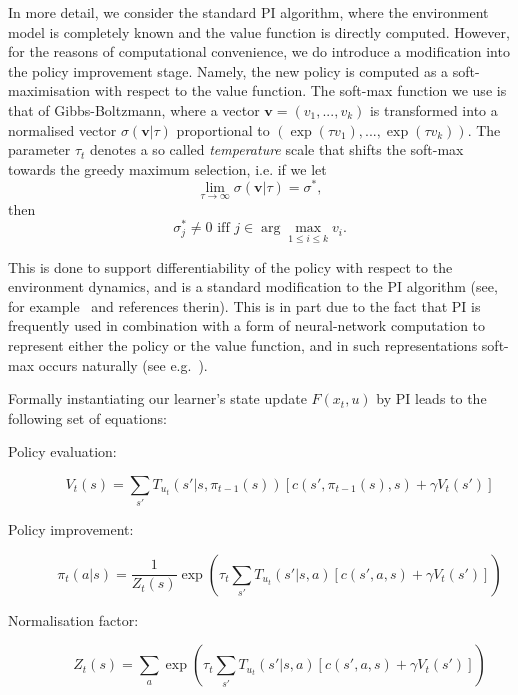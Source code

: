 In more detail, we consider the standard PI algorithm, where the
environment model is completely known and the value function is
directly computed. However, for the reasons of computational
convenience, we do introduce a modification into the policy
improvement stage. Namely, the new policy is computed as a
soft-maximisation with respect to the value function. The soft-max
function we use is that of Gibbs-Boltzmann, where a vector
$\mathbf{v}=(v_1,...,v_k)$ is transformed into a normalised vector
$\sigma(\mathbf{v}|\tau)$ proportional to $(\exp(\tau
v_1),...,\exp(\tau v_k))$. The parameter $\tau_t$ denotes a so called
{\em temperature} scale that shifts the soft-max towards the greedy
maximum selection, i.e. if we let
\[
\lim\limits_{\tau\rightarrow\infty}\sigma(\mathbf{v}|\tau)=\sigma^*,
\]
then 
\[\sigma^*_j\neq 0 \mbox{ iff } j\in\arg\max\limits_{1\leq i\leq k}v_i.\]

This is done to support differentiability of the policy with respect
to the environment dynamics, and is a standard modification to the PI
algorithm (see, for example~\cite{perkins_precup_2003} and references
therin).  This is in part due to the fact that PI is frequently used
in combination with a form of neural-network computation to represent
either the policy or the value function, and in such representations
soft-max occurs naturally (see
e.g.~\cite{bertsekas_tsitsiklis_book_96}).

Formally instantiating our learner's state update $F(x_t,u)$ by PI
leads to the following set of equations: %
\begin{description}
\item[Policy evaluation:]
  \[V_t(s)=\sum\limits_{s'}T_{u_t}(s'|s,\pi_{t-1}(s))\left[
    c(s',\pi_{t-1}(s),s)+\gamma V_t(s')
    \right]\]

\item[Policy improvement:]
\[\pi_t(a|s)=\frac{1}{Z_t(s)}\exp\left(\tau_t\sum\limits_{s'}T_{u_t}(s'|s,a)\left[
    c(s',a,s)+\gamma V_t(s')
    \right]\right) \]
    
\item[Normalisation factor:]
\[Z_t(s)=\sum\limits_a\exp\left(\tau_t\sum\limits_{s'}T_{u_t}(s'|s,a)\left[
    c(s',a,s)+\gamma V_t(s') \right]\right)\]
\end{description}
    

